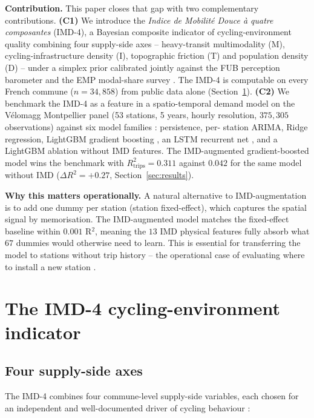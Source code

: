 \documentclass[11pt,a4paper]{article}
\begin{document}
\noindent\textbf{Contribution.}
This paper closes that gap with two complementary contributions.
\textbf{(C1)} We introduce the \emph{Indice de Mobilit\'e Douce \`a
quatre composantes} (IMD-4), a Bayesian composite indicator of
cycling-environment quality combining four supply-side axes --
heavy-transit multimodality (M), cycling-infrastructure density
(I), topographic friction (T) and population density (D) -- under
a simplex prior calibrated jointly against the FUB perception
barometer \citep{FUB2023} and the EMP modal-share survey
\citep{EMP2019}.  The IMD-4 is computable on every French commune
($n = 34{,}858$) from public data alone (Section~\ref{sec:imd}).
\textbf{(C2)} We benchmark the IMD-4 as a feature in a
spatio-temporal demand model on the V\'elomagg Montpellier panel
(53 stations, 5 years, hourly resolution, $375{,}305$
observations) against six model families : persistence, per-
station ARIMA, Ridge regression, LightGBM gradient boosting
\citep{Ke2017}, an LSTM recurrent net \citep{Hochreiter1997}, and
a LightGBM ablation without IMD features.  The IMD-augmented
gradient-boosted model wins the benchmark with
$R^{2}_{\text{trips}} = 0.311$ against $0.042$ for the same model
without IMD ($\Delta R^2 = +0.27$, Section~\ref{sec:results}).

\noindent\textbf{Why this matters operationally.}  A natural
alternative to IMD-augmentation is to add one dummy per station
(station fixed-effect), which captures the spatial signal by
memorisation.  The IMD-augmented model matches the fixed-effect
baseline within $0.001$ R$^2$, meaning the $13$ IMD physical
features fully absorb what $67$ dummies would otherwise need to
learn.  This is essential for transferring the model to stations
without trip history -- the operational case of evaluating where
to install a new station \citep{El-Assi2017,Ashqar2017}.

\section{The IMD-4 cycling-environment indicator}
\label{sec:imd}

\subsection{Four supply-side axes}
\label{sec:axes}

The IMD-4 combines four commune-level supply-side variables, each
chosen for an independent and well-documented driver of cycling
behaviour :
\end{document}
